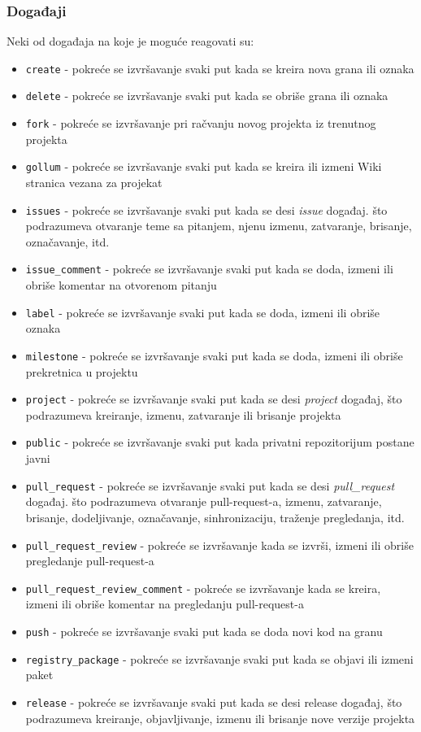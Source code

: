 \documentclass[12pt]{report}
\begin{document}
\subsubsection{Događaji}
Neki od događaja na koje je moguće reagovati su:

\begin{itemize}
    \item \texttt{create} - pokreće se izvršavanje svaki put kada se kreira nova grana ili oznaka
    \item \texttt{delete} - pokreće se izvršavanje svaki put kada se obriše grana ili oznaka
    \item \texttt{fork} - pokreće se izvršavanje pri račvanju novog projekta iz trenutnog projekta
    \item \texttt{gollum} - pokreće se izvršavanje svaki put kada se kreira ili izmeni Wiki stranica vezana za projekat
    \item \texttt{issues} - pokreće se izvršavanje svaki put kada se desi \textit{issue} događaj. što podrazumeva otvaranje teme sa pitanjem, njenu izmenu, zatvaranje, brisanje, označavanje, itd.
    \item \texttt{issue\_comment} - pokreće se izvršavanje svaki put kada se doda, izmeni ili obriše komentar na otvorenom pitanju
    \item \texttt{label} - pokreće se izvršavanje svaki put kada se doda, izmeni ili obriše oznaka
    \item \texttt{milestone} - pokreće se izvršavanje svaki put kada se doda, izmeni ili obriše prekretnica u projektu
    \item \texttt{project} - pokreće se izvršavanje svaki put kada se desi \textit{project} događaj, što podrazumeva kreiranje, izmenu, zatvaranje ili brisanje projekta
    \item \texttt{public} - pokreće se izvršavanje svaki put kada privatni repozitorijum postane javni
    \item \texttt{pull\_request} - pokreće se izvršavanje svaki put kada se desi \textit{pull\_request} događaj. što podrazumeva otvaranje pull-request-a, izmenu, zatvaranje, brisanje, dodeljivanje, označavanje, sinhronizaciju, traženje pregledanja, itd.
    \item \texttt{pull\_request\_review} - pokreće se izvršavanje kada se izvrši, izmeni ili obriše pregledanje pull-request-a
    \item \texttt{pull\_request\_review\_comment} - pokreće se izvršavanje kada se kreira, izmeni ili obriše komentar na pregledanju pull-request-a
    \item \texttt{push} - pokreće se izvršavanje svaki put kada se doda novi kod na granu
    \item \texttt{registry\_package} - pokreće se izvršavanje svaki put kada se objavi ili izmeni paket
    \item \texttt{release} - pokreće se izvršavanje svaki put kada se desi release događaj, što podrazumeva kreiranje, objavljivanje, izmenu ili brisanje nove verzije projekta
\end{itemize}
\end{document}
